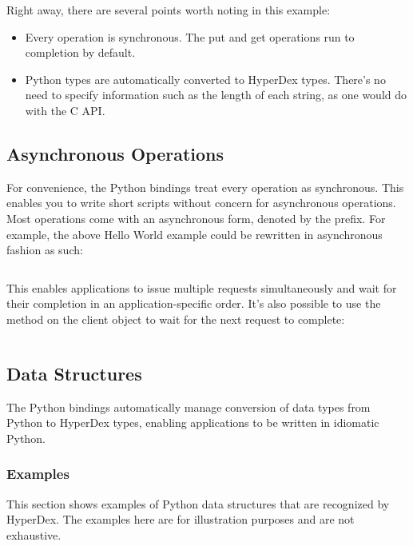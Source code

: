 Right away, there are several points worth noting in this example:

\begin{itemize}
\item Every operation is synchronous.  The put and get operations run to
completion by default.

\item Python types are automatically converted to HyperDex types.  There's no
need to specify information such as the length of each string, as one would do
with the C API.
\end{itemize}

\subsection{Asynchronous Operations}
\label{sec:api:python-client:async-ops}

For convenience, the Python bindings treat every operation as synchronous.  This
enables you to write short scripts without concern for asynchronous operations.
Most operations come with an asynchronous form, denoted by the 
prefix.  For example, the above Hello World example could be rewritten in
asynchronous fashion as such:

\inputminted{python}{\topdir/python/client/hello-world-async-wait.py}

This enables applications to issue multiple requests simultaneously and wait for
their completion in an application-specific order.  It's also possible to use
the  method on the client object to wait for the next request to
complete:

\inputminted{python}{\topdir/python/client/hello-world-async-loop.py}

\subsection{Data Structures}
\label{sec:api:python-client:data-structures}

The Python bindings automatically manage conversion of data types from Python to
HyperDex types, enabling applications to be written in idiomatic Python.

\subsubsection{Examples}
\label{sec:api:python-client:examples}

This section shows examples of Python data structures that are recognized by
HyperDex.  The examples here are for illustration purposes and are not
exhaustive.

